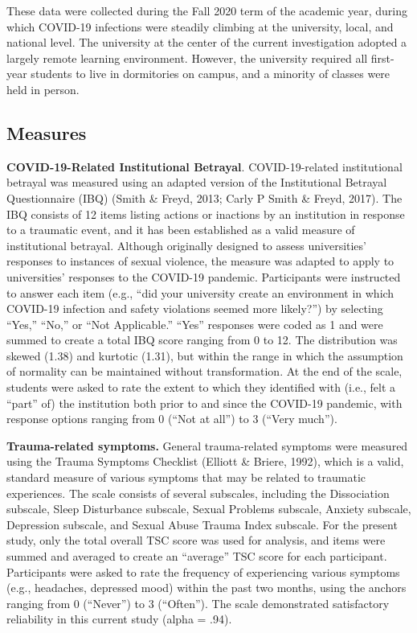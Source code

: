 \documentclass[
  english,
  man, noextraspace]{apa6}
\begin{document}
These data were collected during the Fall 2020 term of the academic year, during which COVID-19 infections were steadily climbing at the university, local, and national level. The university at the center of the current investigation adopted a largely remote learning environment. However, the university required all first-year students to live in dormitories on campus, and a minority of classes were held in person.

\hypertarget{measures}{%
\subsection{Measures}\label{measures}}

\textbf{COVID-19-Related Institutional Betrayal}. COVID-19-related institutional betrayal was measured using an adapted version of the Institutional Betrayal Questionnaire (IBQ) (Smith \& Freyd, 2013; Carly P Smith \& Freyd, 2017). The IBQ consists of 12 items listing actions or inactions by an institution in response to a traumatic event, and it has been established as a valid measure of institutional betrayal. Although originally designed to assess universities' responses to instances of sexual violence, the measure was adapted to apply to universities' responses to the COVID-19 pandemic. Participants were instructed to answer each item (e.g., \enquote{did your university create an environment in which COVID-19 infection and safety violations seemed more likely?}) by selecting \enquote{Yes,} \enquote{No,} or \enquote{Not Applicable.} \enquote{Yes} responses were coded as 1 and were summed to create a total IBQ score ranging from 0 to 12. The distribution was skewed (1.38) and kurtotic (1.31), but within the range in which the assumption of normality can be maintained without transformation. At the end of the scale, students were asked to rate the extent to which they identified with (i.e., felt a \enquote{part} of) the institution both prior to and since the COVID-19 pandemic, with response options ranging from 0 (\enquote{Not at all}) to 3 (\enquote{Very much}).

\textbf{Trauma-related symptoms.} General trauma-related symptoms were measured using the Trauma Symptoms Checklist (Elliott \& Briere, 1992), which is a valid, standard measure of various symptoms that may be related to traumatic experiences. The scale consists of several subscales, including the Dissociation subscale, Sleep Disturbance subscale, Sexual Problems subscale, Anxiety subscale, Depression subscale, and Sexual Abuse Trauma Index subscale. For the present study, only the total overall TSC score was used for analysis, and items were summed and averaged to create an \enquote{average} TSC score for each participant. Participants were asked to rate the frequency of experiencing various symptoms (e.g., headaches, depressed mood) within the past two months, using the anchors ranging from 0 (\enquote{Never}) to 3 (\enquote{Often}). The scale demonstrated satisfactory reliability in this current study (alpha = .94).
\end{document}
